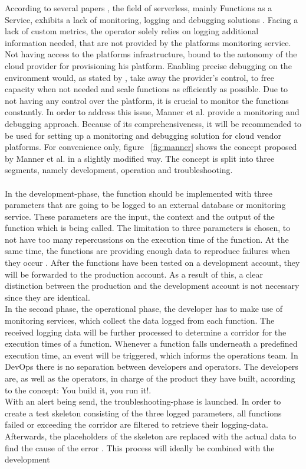 \documentclass[a4paper,twoside,11pt, pagesize]{scrartcl}
\begin{document}
\begin{spacing}{1.2}
According to several papers \cite{roberts2017serverless} \cite{baldini2017serverless}, the field of serverless, mainly Functions as a Service, exhibits a lack of monitoring, logging and debugging solutions \cite{kritikos2018review}. Facing a lack of custom metrics, the operator solely relies on logging additional information needed, that are not provided by the platforms monitoring service. Not having access to the platforms infrastructure, bound to the autonomy of the cloud provider for provisioning his platform. Enabling precise debugging on the environment would, as stated by \cite{manner2019troubleshooting}, take away the provider's control, to free capacity when not needed and scale functions as efficiently as possible. Due to not having any control over the platform, it is crucial to monitor the functions constantly. In order to address this issue, Manner et al. provide a monitoring and debugging approach. Because of its comprehensiveness, it will be recommended to be used for setting up a monitoring and debugging solution for cloud vendor platforms. For convenience only, figure ~\ref{fig:manner} shows the concept proposed by Manner et al. in a slightly modified way. The concept is split into three segments, namely development, operation and troubleshooting.\\\\ In the development-phase, the function should be implemented with three parameters that are going to be logged to an external database or monitoring service. These parameters are the input, the context and the output of the function which is being called. The limitation to three parameters is chosen, to not have too many repercussions on the execution time of the function. At the same time, the functions are providing enough data to reproduce failures when they occur \cite{manner2019troubleshooting}. After the functions have been tested on a development account, they will be forwarded to the production account. As a result of this, a clear distinction between the production and the development account is not necessary since they are identical. \\ In the second phase, the operational phase, the developer has to make use of monitoring services, which collect the data logged from each function. The received logging data will be further processed to determine a corridor for the execution times of a function. Whenever a function falls underneath a predefined execution time, an event will be triggered, which informs the operations team. In DevOps there is no separation between developers and operators. The developers are, as well as the operators, in charge of the product they have built, according to the concept: \glqq You build it, you run it!\grqq{}.\\ With an alert being send, the troubleshooting-phase is launched. In order to create a test skeleton consisting of the three logged parameters, all functions failed or exceeding the corridor are filtered to retrieve their logging-data. Afterwards, the placeholders of the skeleton are replaced with the actual data to find the cause of the error \cite{manner2019troubleshooting}. This process will ideally be combined with the development 
\end{spacing}
\end{document}
